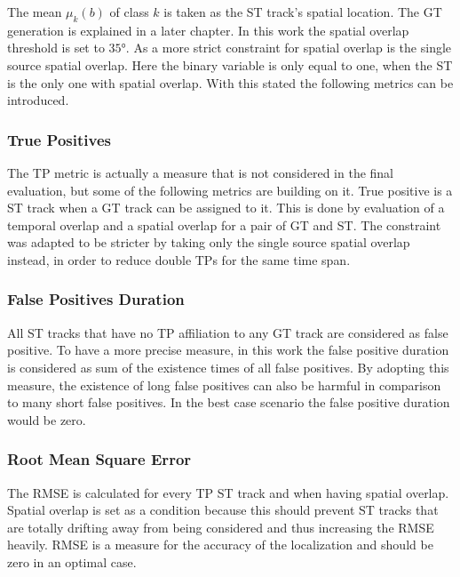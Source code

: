 The mean $\mu_k(b)$ of class $k$ is taken as the \ac{ST} track's spatial location. The \ac{GT} generation is explained in a later chapter. In this work the spatial overlap threshold is set to
$\ang{35}$. As a more strict constraint for spatial overlap is the single source spatial overlap. Here the binary variable is only equal to one, when the \ac{ST} is the only one with spatial overlap.
With this stated the following metrics can be introduced.

\subsubsection{True Positives}
The \ac{TP} metric is actually a measure that is not considered in the final evaluation, but some of the following metrics are building on it. True positive is a \ac{ST} track when a \ac{GT} track can be assigned to it. This is done
by evaluation of a temporal overlap and a spatial overlap for a pair of \ac{GT} and ST. The constraint was adapted to be stricter by taking only the single source spatial overlap instead, in order to reduce double \acp{TP} for the same time span.

\subsubsection{False Positives Duration}
All \ac{ST} tracks that have no \ac{TP} affiliation to any \ac{GT} track are considered as false positive. To have a more precise measure, in this work the false positive duration is considered as sum of the existence times of all false positives.
By adopting this measure, the existence of long false positives can also be harmful in comparison to many short false positives. In the best case scenario the false positive duration would be zero.

\subsubsection{Root Mean Square Error}
The \ac{RMSE} is calculated for every \ac{TP} \ac{ST} track and when having spatial overlap. Spatial overlap is set as a condition because this should prevent \ac{ST} tracks that are totally drifting away from being considered and thus increasing the RMSE heavily.
RMSE is a measure for the accuracy of the localization and should be zero in an optimal case.

